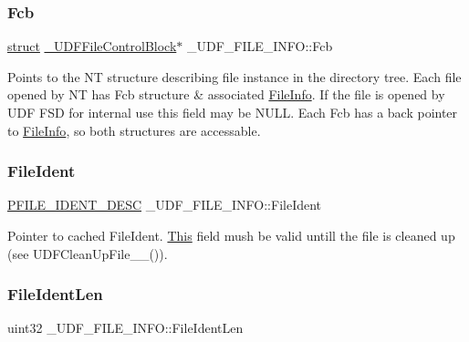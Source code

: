\subsubsection{\texorpdfstring{Fcb}{Fcb}}
{\footnotesize\ttfamily \hyperlink{interfacestruct}{struct} \hyperlink{struct___u_d_f_file_control_block}{\+\_\+\+U\+D\+F\+File\+Control\+Block}$\ast$ \+\_\+\+U\+D\+F\+\_\+\+F\+I\+L\+E\+\_\+\+I\+N\+F\+O\+::\+Fcb}

Points to the NT structure describing file instance in the directory tree. Each file opened by NT has Fcb structure \& associated \hyperlink{struct_file_info}{File\+Info}. If the file is opened by U\+DF F\+SD for internal use this field may be N\+U\+LL. Each Fcb has a back pointer to \hyperlink{struct_file_info}{File\+Info}, so both structures are accessable. \mbox{\label{struct___u_d_f___f_i_l_e___i_n_f_o_aa0f68d065867f9542991b9a1b067fd38}} 
\subsubsection{\texorpdfstring{File\+Ident}{FileIdent}}
{\footnotesize\ttfamily \hyperlink{struct___f_i_l_e___i_d_e_n_t___d_e_s_c}{P\+F\+I\+L\+E\+\_\+\+I\+D\+E\+N\+T\+\_\+\+D\+E\+SC} \+\_\+\+U\+D\+F\+\_\+\+F\+I\+L\+E\+\_\+\+I\+N\+F\+O\+::\+File\+Ident}

Pointer to cached File\+Ident. \hyperlink{namespace_this}{This} field mush be valid untill the file is cleaned up (see U\+D\+F\+Clean\+Up\+File\+\_\+\+\_\+()). \mbox{\label{struct___u_d_f___f_i_l_e___i_n_f_o_a2b38b6cc624ed9975551dec56989beaa}} 
\subsubsection{\texorpdfstring{File\+Ident\+Len}{FileIdentLen}}
{\footnotesize\ttfamily uint32 \+\_\+\+U\+D\+F\+\_\+\+F\+I\+L\+E\+\_\+\+I\+N\+F\+O\+::\+File\+Ident\+Len}

